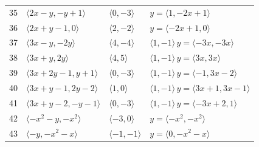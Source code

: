 \documentclass[11pt]{article}
\begin{document}
\begin{longtable}{@{}rlll@{}}
35 & $\langle 2x-y,-y+1\rangle$ & $\langle 0,-3\rangle$ & $y=\langle 1,-2x+1\rangle$\\
36 & $\langle 2x+y-1,0\rangle$ & $\langle 2,-2\rangle$ & $y=\langle -2x+1,0\rangle$\\
37 & $\langle 3x-y,-2y\rangle$ & $\langle 4,-4\rangle$ & $\langle 1,-1\rangle\,y=\langle -3x,-3x\rangle$\\
38 & $\langle 3x+y,2y\rangle$ & $\langle 4,5\rangle$ & $\langle 1,-1\rangle\,y=\langle 3x,3x\rangle$\\
39 & $\langle 3x+2y-1,y+1\rangle$ & $\langle 0,-3\rangle$ & $\langle 1,-1\rangle\,y=\langle -1,3x-2\rangle$\\
40 & $\langle 3x+y-1,2y-2\rangle$ & $\langle 1,0\rangle$ & $\langle 1,-1\rangle\,y=\langle 3x+1,3x-1\rangle$\\
41 & $\langle 3x+y-2,-y-1\rangle$ & $\langle 0,-3\rangle$ & $\langle 1,-1\rangle\,y=\langle -3x+2,1\rangle$\\
42 & $\langle -x^{2}-y,-x^{2}\rangle$ & $\langle -3,0\rangle$ & $y=\langle -x^{2},-x^{2}\rangle$\\
43 & $\langle -y,-x^{2}-x\rangle$ & $\langle -1,-1\rangle$ & $y=\langle 0,-x^{2}-x\rangle$\\
\end{longtable}
\endgroup
\end{document}
